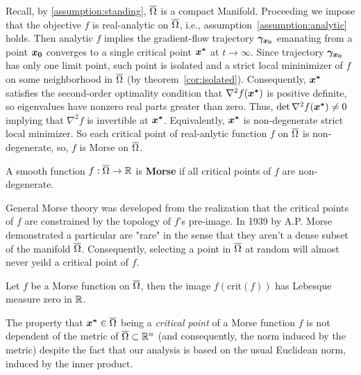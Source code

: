 \documentclass[10pt]{article}
\begin{document}
        Recall, by \ref{assumption:standing}, $\overline{\Omega}$ is a compact Manifold. 
        Proceeding we impose that the objective $f$ is real-analytic on $\overline{\Omega}$, i.e.,
        assumption~\ref{assumption:analytic} holds. Then analytic $f$ implies the 
        gradient-flow trajectory $\bm{\gamma_{\bm{x_0}}}$ emanating from
        a point $\bm{x_0}$ converges to a single critical point $\bm{x^*}$ at $t \to \infty$.
        Since trajectory $\bm{\gamma_{\bm{x_0}}}$ has only one limit point, such 
        point is isolated and a strict local mininimizer of $f$ on some neighborhood
        in $\overline{\Omega}$ (by theorem~\ref{cor:isolated}). Consequently, $\bm{x^*}$ 
        satisfies the second-order optimality condition that $\nabla^2 f(\bm{x^*})$ is 
        positive definite, so eigenvalues have nonzero real parts greater than zero. Thus, 
        $\det \nabla^2 f(\bm{x^*}) \neq 0$ implying that $\nabla^2 f$ is invertible at
        $\bm{x^*}$. Equivalently, $\bm{x^*}$ is non-degenerate strict local minimizer.
        So each critical point of real-anlytic function $f$ on $\overline{\Omega}$ 
        is non-degenerate, so, $f$ is Morse on $\overline{\Omega}$. 
        
        \medskip

        \begin{definition}
            A smooth function $f : \overline{\Omega} \rightarrow \mathbb{R}$ is \textbf{Morse} if 
            all critical points of $f$ are non-degenerate.
        \end{definition}

        \medskip
        
        General Morse theory was developed from the realization that the critical points of $f$ are 
        constrained by the topology of $f$'s pre-image. In 1939 by A.P. Morse demonstrated a particular
        are "rare" in the sense that they aren't a dense subset of the manifold $\overline{\Omega}$. 
        Consequently, selecting a point in $\overline{\Omega}$ at random will almost never yeild a critical point of $f$.

        \begin{theorem}\label{thm:sards}
            Let $f$ be a Morse function on $\overline{\Omega}$, then the image 
            $f(\text{crit}(f))$ has Lebesque measure zero in $\mathbb{R}$.
        \end{theorem}

        \medskip

        The property that $\bm{x^*} \in \overline{\Omega}$ being a \emph{critical point} of a Morse function $f$ is
        not dependent of the metric of $\overline{\Omega} \subset \mathbb{R}^n$ (and consequently, the norm induced by the metric)
        despite the fact that our analysis is based on the usual Euclidean norm, induced by the inner product. 
\end{document}
